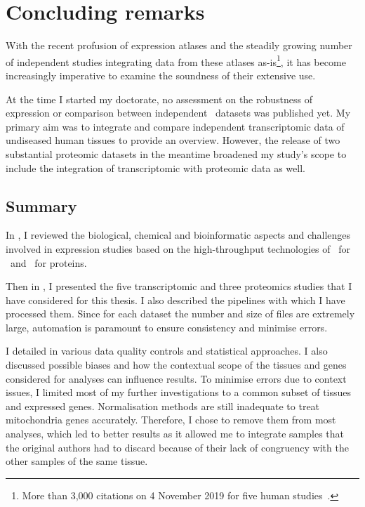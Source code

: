 \chapter{Concluding remarks}\label{ch:conclusion}

\setlength{\epigraphwidth}{0.49\textwidth}%
    \setlength{\epigraphrule}{0pt}%

With the recent profusion of expression atlases
and the steadily growing number of independent studies
integrating data from these atlases as-is\footnote{%
More than 3,000 citations on 4 November 2019 for five human studies~.},
it has become increasingly imperative to examine
the soundness of their extensive use.\mybr\

At the time I started my doctorate,
no assessment on the robustness of expression or
comparison between independent \Rnaseq\ datasets was published yet.
My primary aim was to integrate and compare independent transcriptomic data
of undiseased human tissues to provide an overview.
However, the release of two substantial proteomic datasets in the meantime
broadened my study's scope
to include the integration of transcriptomic with proteomic data as well.\mybr\

\vspace{-2mm}
\section*{Summary}
\vspace{-5mm}
In ,
I reviewed the biological, chemical and bioinformatic aspects and challenges
involved in expression studies based on the high-throughput technologies
of \Rnaseq\ for \mRNAs\ and \ms\ for proteins.

Then in ,
I presented the five transcriptomic and three proteomics studies
that I have considered for this thesis.
I also described the pipelines with which I have processed them.
Since for each dataset the number and size of files are extremely large,
automation is paramount to ensure consistency and minimise errors.

I detailed in  various data quality controls
and statistical approaches.
I also discussed possible biases and
how the contextual scope of the tissues and genes considered for analyses
can influence results.
To minimise errors due to context issues,
I limited most of my further investigations to
a common subset of tissues and expressed genes.
Normalisation methods are still inadequate
to treat mitochondria genes accurately.
Therefore, I chose to remove them from most analyses,
which led to better results
as it allowed me to integrate samples
that the original authors had to discard
because of their lack of congruency with the other samples of the same tissue.


